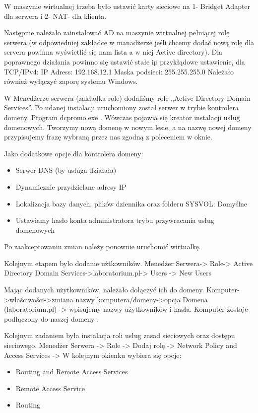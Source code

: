 \documentclass[a4paper,twoside,12pt]{mgr}
\begin{document}
W maszynie wirtualnej trzeba było ustawić karty sieciowe na 1- Bridget Adapter dla serwera i 2- NAT- dla klienta. 

Następnie należało zainstalować AD na maszynie wirtualnej pełniącej rolę serwera (w odpowiedniej zakładce w manadżerze jeśli chcemy dodać nową rolę dla servera powinna wyświetlić się nam lista a w niej Active directory). Dla poprawnego działania powinno się ustawić stałe ip przykłądowe ustawienie, dla TCP/IPv4:
IP Adress: 192.168.12.1
Maska podsieci: 255.255.255.0
Należało również wyłączyć zaporę systemu Windows.

W Menedżerze serwera (zakładka role) dodaliśmy rolę „Active Directory Domain Services”. Po udanej instalacji uruchomiony został serwer w trybie kontrolera domeny. Program dcpromo.exe . Wówczas pojawia się kreator instalacji usług domenowych. Tworzymy nową domenę w nowym lesie, a na nazwę nowej domeny przypisujemy frazę wybraną przez nas zgodną z poleceniem w oknie.

Jako dodatkowe opcje dla kontrolera domeny:
\begin{itemize}
\item Serwer DNS (by usługa działała)
\item Dynamicznie przydzielane adresy IP
\item Lokalizacja bazy danych, plików dziennika oraz folderu SYSVOL: Domyślne
\item Ustawiamy hasło konta administratora trybu przywracania usług domenowych 
\end{itemize}

Po zaakceptowaniu zmian należy ponownie uruchomić wirtualkę.

Kolejnym etapem było dodanie użtkowników.
Menedżer Serwera-> Role-> Active Directory Domain Services->laboratorium.pl-> Users -> New Users

Mając dodanych użytkowników, należało dołączyć ich do domeny. Komputer->właściwości->zmiana nazwy komputera/domeny->opcja Domena (laboratorium.pl) -> wpisujemy nazwy użytkowników i hasła. Komputer zostaje podłączony do naszej domeny .

Kolejnym zadaniem była instalacja roli usług zasad sieciowych oraz dostępu sieciowego.
Menedżer Serwera -> Role -> Dodaj rolę -> Network Policy and Access Services -> W kolejnym okienku wybiera się opcje:
\begin{itemize}
\item Routing and Remote Access Services
\item Remote Access Service
\item Routing
\end{itemize}
\end{document}
